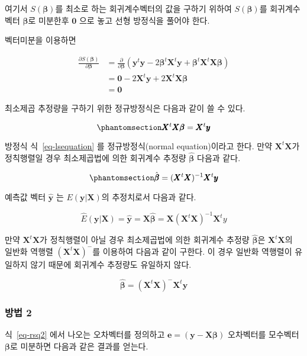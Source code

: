 \documentclass[
  11pt,
  a4paper,
  oneside]{scrbook}
\newcommand{\pardifftwo}[2]{\frac{\partial #1}{\partial #2 }}
\theoremstyle{definition}
\theoremstyle{plain}
\theoremstyle{definition}
\theoremstyle{definition}
\theoremstyle{remark}
\begin{document}
여기서 \(S( \pmb \beta)\)를 최소로 하는 회귀계수벡터의 값을 구하기
위하여 \(S( \pmb \beta)\)를 회귀계수벡터 \(\pmb \beta\)로 미분한후
\(\pmb 0\) 으로 놓고 선형 방정식을 풀어야 한다.

벡터미분을 이용하면

\[
\begin{align}
 \pardifftwo{ S( {\pmb \beta})}{\pmb \beta} & = 
 \pardifftwo{}{\pmb \beta} (\pmb y^t \pmb y -2  \pmb \beta^t \pmb X^t \pmb y
    + \pmb \beta^t \pmb X^t \pmb X \pmb \beta) \\
 & = \pmb 0 -2 \pmb X^t \pmb y + 2 \pmb X^t \pmb X \pmb \beta \\
 & =\pmb 0
\end{align}
\]

최소제곱 추정량을 구하기 위한 정규방정식은 다음과 같이 쓸 수 있다.

\begin{equation}\phantomsection\label{eq-lsequation}{
\pmb X^t \pmb X \pmb \beta =  \pmb X^t \pmb y
}\end{equation}

방정식 식~\ref{eq-lsequation} 를 정규방정식(normal equation)이라고 한다.
만약 \(\pmb X^t \pmb X\)가 정칙행렬일 경우 최소제곱법에 의한 회귀계수
추정량 \(\hat {\pmb \beta}\) 다음과 같다.

\begin{equation}\phantomsection\label{eq-lsestimator}{
\hat {\pmb \beta} = ( \pmb X^t \pmb X)^{-1} \pmb X^t \pmb y
}\end{equation}

예측값 벡터 \(\hat {\pmb y}\) 는 \(E(\pmb y | \pmb X)\)의 추정치로서
다음과 같다.

\[ \hat E(\pmb y | \pmb X)= \hat {\pmb y} = \pmb X \hat {\pmb \beta} = \pmb  X(\pmb X^t \pmb X)^{-1} \pmb X^t y \]

만약 \(\pmb X^t \pmb X\)가 정칙행렬이 아닐 경우 최소제곱법에 의한
회귀계수 추정량 \(\hat {\pmb \beta}\)은 \(\pmb X^t \pmb X\)의 일반화
역행렬 \((\pmb X^t \pmb X)^-\)를 이용하여 다음과 같이 구한다. 이 경우
일반화 역행렬이 유일하지 않기 때문에 회귀계수 추정량도 유일하지 않다.

\[
  \hat {\pmb \beta} = ( \pmb X^t \pmb X)^{-} \pmb X^t \pmb y
\]

\subsubsection{방법 2}\label{uxbc29uxbc95-2}

식~\ref{eq-rsq2} 에서 나오는 오차벡터를 정의하고
\(\pmb e = (\pmb y - \pmb X \pmb \beta)\) 오차벡터를 모수벡터
\(\pmb \beta\)로 미분하면 다음과 같은 결과를 얻는다.
\end{document}
